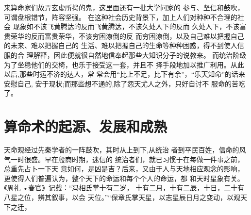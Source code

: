 来算命家们故弄玄虚所捣的鬼，这里面还有一批大学问家的
参与、坚信和鼓吹，可谓盘根错节，阵容坚强。
在这种社会历史背景下，加上人们对种种不合理的社会
现象如不该飞黄腾达的反而飞黄腾达，不该久处人下的反而
久处人下，不该富贵荣华的反而富贵荣华，不该穷困潦倒的反
而穷困潦倒，以及自己难以把握自己的未来、难以把握自己的
生活、难以把握自己的生命等种种困惑，得不到使人信服的合
理解释，因此便就很自然地信奉起那些大知识分子的说教来。
而统治阶级为了坐稳他们的交椅，也乐于接受这一套，并且不
择手段地加以推广利用。从此以后,那些时运不济的达人，常
常会用“比上不足，比下有余”，“乐天知命”的话来安慰自己,
安于现状;而那些想不通的,除了怨天尤人之外，只好自讨不
服命的苦吃了。

\section{算命术的起源、发展和成熟}
天命观经过先秦学者的一阵鼓吹，其时从上到下,从统治
者到平民百姓，信命的风气一时很盛。早在殷商时期，迷信的
统治者们，就已习惯于在每做一件事之前，总重先占卜一下天
意如何，是凶是吉？后来，又由于人与天地相应观念的影响，
更使得人们普遍认为，整个天下的命运和每个个人的命运，都
和天时星象有关。《周礼 •春官》记载：“冯相氏掌十有二岁，
十有二月，十有二辰，十日，二十有八星之位，辨其叙事，以会
天位。”“保章氏掌天星，以志星辰日月之变动，以观天下之迁，

